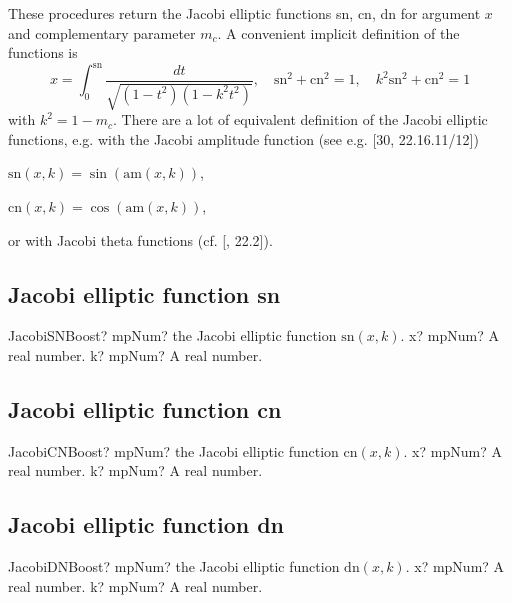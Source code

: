 These procedures return the Jacobi elliptic functions sn, cn, dn for argument $x$ and
complementary parameter $m_c$. A convenient implicit definition of the functions is
\begin{equation}
	x = \int_0^{\text{sn}} \frac{dt}{\sqrt{(1-t^2)(1-k^2 t^2)}}, \quad \text{sn}^2 + \text{cn}^2 = 1,  \quad k^2 \text{sn}^2 + \text{cn}^2 = 1
\end{equation}
with $k^2 = 1 - m_c$. There are a lot of equivalent definition of the Jacobi elliptic functions, e.g. with the Jacobi amplitude function (see e.g. \cite{NIST} [30, 22.16.11/12]) 
\begin{center}
	$\text{sn}(x, k) = \sin(\text{am}(x, k))$, 
	
	$\text{cn}(x, k) = \cos(\text{am}(x, k))$, 
\end{center}

or with Jacobi theta functions (cf. [\cite{NIST}, 22.2]).
\subsection{Jacobi elliptic function sn}

\begin{mpFunctionsExtract}
	\mpFunctionTwo
	{JacobiSNBoost? mpNum? the Jacobi elliptic function $\text{sn}(x, k)$.}
	{x? mpNum? A real number.}
	{k? mpNum? A real number.}
\end{mpFunctionsExtract}



\subsection{Jacobi elliptic function cn}

\begin{mpFunctionsExtract}
	\mpFunctionTwo
	{JacobiCNBoost? mpNum? the Jacobi elliptic function $\text{cn}(x, k)$.}
	{x? mpNum? A real number.}
	{k? mpNum? A real number.}
\end{mpFunctionsExtract}




\subsection{Jacobi elliptic function dn}

\begin{mpFunctionsExtract}
	\mpFunctionTwo
	{JacobiDNBoost? mpNum? the Jacobi elliptic function $\text{dn}(x, k)$.}
	{x? mpNum? A real number.}
	{k? mpNum? A real number.}
\end{mpFunctionsExtract}


